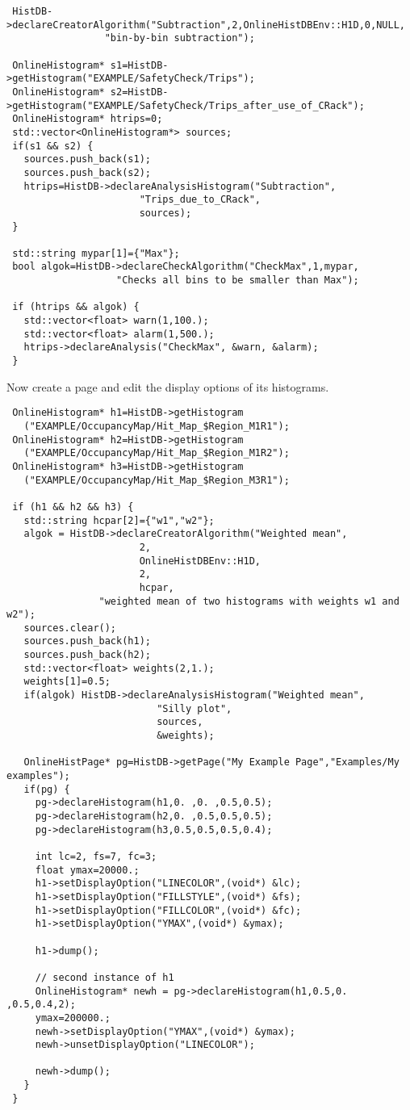 \documentclass{lhcbnote}
\begin{document}
\begin{verbatim}
 HistDB->declareCreatorAlgorithm("Subtraction",2,OnlineHistDBEnv::H1D,0,NULL,
				 "bin-by-bin subtraction");

 OnlineHistogram* s1=HistDB->getHistogram("EXAMPLE/SafetyCheck/Trips");
 OnlineHistogram* s2=HistDB->getHistogram("EXAMPLE/SafetyCheck/Trips_after_use_of_CRack");
 OnlineHistogram* htrips=0;
 std::vector<OnlineHistogram*> sources;
 if(s1 && s2) {
   sources.push_back(s1);
   sources.push_back(s2);
   htrips=HistDB->declareAnalysisHistogram("Subtraction",
					   "Trips_due_to_CRack",
					   sources);
 }

 std::string mypar[1]={"Max"};
 bool algok=HistDB->declareCheckAlgorithm("CheckMax",1,mypar,
			       "Checks all bins to be smaller than Max");
 
 if (htrips && algok) {
   std::vector<float> warn(1,100.);
   std::vector<float> alarm(1,500.);
   htrips->declareAnalysis("CheckMax", &warn, &alarm);
 } 
\end{verbatim}
Now create a page and edit the display options of its
histograms. 
\begin{verbatim}
 OnlineHistogram* h1=HistDB->getHistogram
   ("EXAMPLE/OccupancyMap/Hit_Map_$Region_M1R1");
 OnlineHistogram* h2=HistDB->getHistogram
   ("EXAMPLE/OccupancyMap/Hit_Map_$Region_M1R2");
 OnlineHistogram* h3=HistDB->getHistogram
   ("EXAMPLE/OccupancyMap/Hit_Map_$Region_M3R1");

 if (h1 && h2 && h3) {
   std::string hcpar[2]={"w1","w2"};
   algok = HistDB->declareCreatorAlgorithm("Weighted mean",
					   2,
					   OnlineHistDBEnv::H1D,
					   2,
					   hcpar,
				"weighted mean of two histograms with weights w1 and w2");
   sources.clear();
   sources.push_back(h1);
   sources.push_back(h2);
   std::vector<float> weights(2,1.);
   weights[1]=0.5;
   if(algok) HistDB->declareAnalysisHistogram("Weighted mean",
					      "Silly plot",
					      sources,
					      &weights);

   OnlineHistPage* pg=HistDB->getPage("My Example Page","Examples/My examples");
   if(pg) {
     pg->declareHistogram(h1,0. ,0. ,0.5,0.5);
     pg->declareHistogram(h2,0. ,0.5,0.5,0.5);
     pg->declareHistogram(h3,0.5,0.5,0.5,0.4);
   
     int lc=2, fs=7, fc=3;
     float ymax=20000.;
     h1->setDisplayOption("LINECOLOR",(void*) &lc);
     h1->setDisplayOption("FILLSTYLE",(void*) &fs);
     h1->setDisplayOption("FILLCOLOR",(void*) &fc); 
     h1->setDisplayOption("YMAX",(void*) &ymax); 

     h1->dump();

     // second instance of h1
     OnlineHistogram* newh = pg->declareHistogram(h1,0.5,0. ,0.5,0.4,2);
     ymax=200000.;
     newh->setDisplayOption("YMAX",(void*) &ymax); 
     newh->unsetDisplayOption("LINECOLOR");

     newh->dump();
   }
 }
\end{verbatim}
\end{document}
